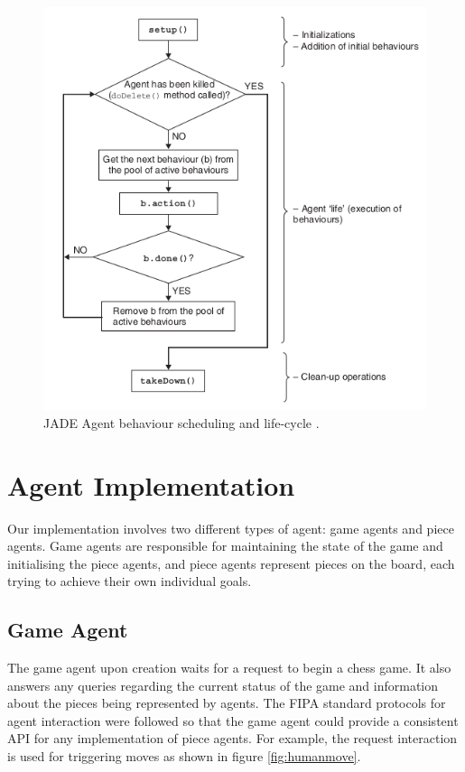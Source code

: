 \documentclass[conference]{IEEEtran}
\begin{document}
\begin{figure}[!h]
	\centering
	\includegraphics[width=\linewidth]{images/behaviour}
	\caption{JADE Agent behaviour scheduling and life-cycle \cite{jade}.}
	\label{fig:behaviour}
\end{figure}

\section{Agent Implementation} \label{sec:agentimpl}

Our implementation involves two different types of agent: game agents and piece agents. Game agents are responsible for maintaining the state of the game and initialising the piece agents, and piece agents represent pieces on the board, each trying to achieve their own individual goals.

\subsection{Game Agent}

The game agent upon creation waits for a request to begin a chess game. It also answers any queries regarding the current status of the game and information about the pieces being represented by agents. The FIPA standard protocols for agent interaction \cite{fipaprotocols} were followed so that the game agent could provide a consistent API for any implementation of piece agents. For example, the request interaction is used for triggering moves as shown in figure \ref{fig:humanmove}. 
\end{document}
